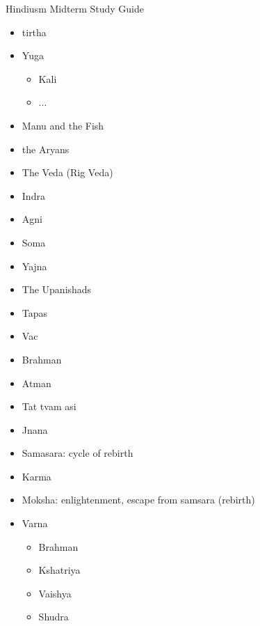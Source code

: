 \documentclass[11pt]{article} %
\begin{document}
\begin{center}
Hindiusm Midterm Study Guide
\end{center}

\begin{itemize}

\item
tirtha

\item
Yuga
\begin{itemize}
\item Kali
\item ...
\end{itemize}

\item
Manu and the Fish

\item
the Aryans

\item
The Veda (Rig Veda)

\item
Indra

\item
Agni

\item
Soma

\item
Yajna

\item
The Upanishads

\item
Tapas

\item
Vac

\item
Brahman

\item
Atman

\item
Tat tvam asi

\item
Jnana

\item
Samasara: cycle of rebirth

\item
Karma

\item
Moksha: enlightenment, escape from samsara (rebirth)

\item
Varna
\begin{itemize}
\item Brahman
\item Kshatriya
\item Vaishya
\item Shudra
\end{itemize}


\end{itemize}
\end{document}
